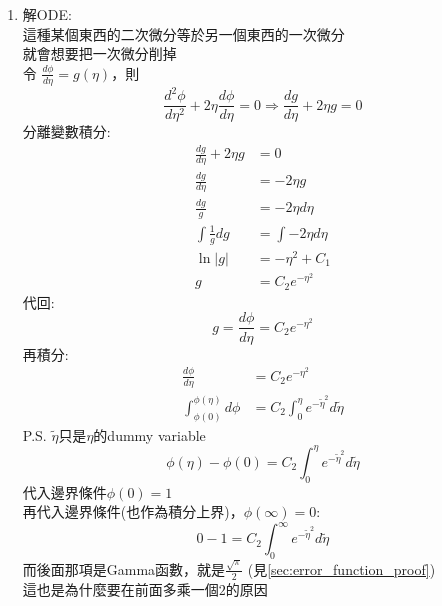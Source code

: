 \documentclass[../main.tex]{subfiles}
\begin{document}
\begin{itemize}
\begin{enumerate}
\begin{itemize}
\begin{enumerate}
\begin{equation}
          u_x(y,0) = u_x(\infty, t) = 0
        \end{equation}
        \item 解ODE:\\
        這種某個東西的二次微分等於另一個東西的一次微分\\
        就會想要把一次微分削掉\\
        令 $\frac{d\phi}{d\eta} = g(\eta)$，則
        \begin{equation}
          \frac{d^2 \phi}{d \eta^2} + 2\eta \frac{d \phi}{d \eta} = 0 \Rightarrow \frac{dg}{d\eta} + 2\eta g = 0
        \end{equation}
        分離變數積分:
        \begin{align}
          \frac{dg}{d\eta} + 2\eta g &= 0 \nonumber\\
          \frac{dg}{d\eta} &= -2\eta g \nonumber\\
          \frac{dg}{g} &= -2\eta d\eta \nonumber\\
          \int \frac{1}{g} dg &= \int -2\eta d\eta \nonumber\\
          \ln |g| &= -\eta^2 + C_1 \nonumber\\
          g &= C_2 e^{-\eta^2} \label{eq:ch2_4_unsteady_state_g}
        \end{align}
        代回:
        \begin{equation}
          g = \frac{d\phi}{d\eta} = C_2 e^{-\eta^2}
        \end{equation}
        再積分:
        \begin{align}
          \frac{d\phi}{d\eta} &= C_2 e^{-\eta^2} \nonumber\\
          \int_{\phi(0)}^{\phi(\eta)} d\phi &= C_2 \int_0^{\eta} e^{-\tilde\eta^2} d\tilde\eta
        \end{align}
        P.S. $\tilde\eta$只是$\eta$的dummy variable
        \begin{equation}
          \phi(\eta) - \phi(0) = C_2 \int_0^{\eta} e^{-\tilde\eta^2} d\tilde\eta
        \end{equation}
        代入邊界條件$\phi(0) = 1$\\
        再代入邊界條件(也作為積分上界)，$\phi(\infty) = 0$:
        \begin{equation}
          0 - 1 = C_2 \int_0^{\infty} e^{-\tilde\eta^2} d\tilde\eta
        \end{equation}
        而後面那項是Gamma函數，就是$\frac{\sqrt{\pi}}{2}$ (見\ref{sec:error_function_proof})\\
        這也是為什麼要在前面多乘一個$2$的原因

\end{enumerate}
\end{itemize}
\end{enumerate}
\end{itemize}
\end{document}
